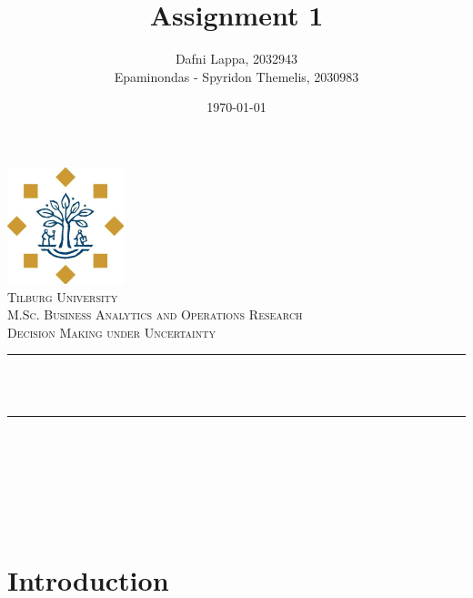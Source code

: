\documentclass[12pt]{article}
\title{Assignment 1}
\author{ Dafni Lappa, 2032943 \\
	Epaminondas - Spyridon Themelis, 2030983}                               %
\date{\today}                                           %
\makeatletter
\let\thetitle\@title
\let\theauthor\@author
\let\thedate\@date
\makeatother
\begin{document}
	
	
	\begin{titlepage}
		\centering
		\vspace*{0.5 cm}
		\includegraphics[scale = 0.75]{logo.png}\\[1.0 cm]   %
		\textsc{\LARGE Tilburg University}\\[2.0 cm]   %
		\textsc{\Large M.Sc. Business Analytics and Operations Research}\\[0.5 cm]               %
		\textsc{\large Decision Making under Uncertainty}\\[0.5 cm]               %
		\rule{\linewidth}{0.2 mm} \\[0.4 cm]
		{ \huge \bfseries \thetitle}\\
		\rule{\linewidth}{0.2 mm} \\[1.5 cm]
		
		\begin{minipage}{0.4\textwidth}
			\begin{center} \large
				\theauthor
			\end{center}
		\end{minipage}~
		\begin{minipage}{0.4\textwidth}
		\end{minipage}\\[2 cm]
		
		{\large \thedate}\\[2 cm]
		
		\vfill
		
	\end{titlepage}
	
	
	\tableofcontents
	\newpage
	\listoffigures
	\newpage
	\listoftables
	\newpage
	
	
	\section{Introduction}
	
\end{document}
